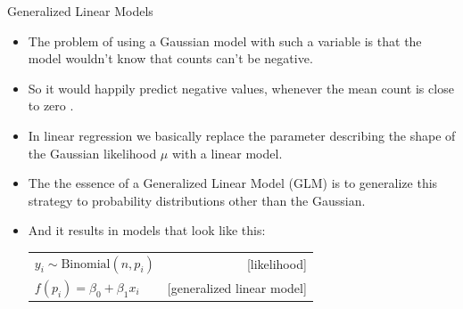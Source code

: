\documentclass[handout]{beamer}
\begin{document}
\begin{frame}{Generalized Linear Models}
\scriptsize{
\begin{itemize}


\item The problem of using a Gaussian model with such a variable is that the model wouldn't know that counts can't be negative.

\item So it would happily predict negative values, whenever the mean count is close to zero \cite{mcelreath2020statistical}.

\item In linear regression we basically replace the parameter describing the shape of the Gaussian likelihood $\mu$ with a linear model.

\item The the essence of a Generalized Linear Model (GLM) is to generalize this strategy to probability distributions other than the Gaussian.

\item And it results in models that look like this:

 \vspace{0.3cm}
 \begin{table}
 \centering
 \begin{tabular}{lr}
$y_i \sim \text{Binomial}(n,p_i)$ & [likelihood] \\
$f(p_i) = \beta_0 + \beta_1 x_i$ & [generalized linear model] \\
\end{tabular}
\end{table}
 \vspace{0.3cm}


\end{itemize}



}

\end{frame}
\end{document}
